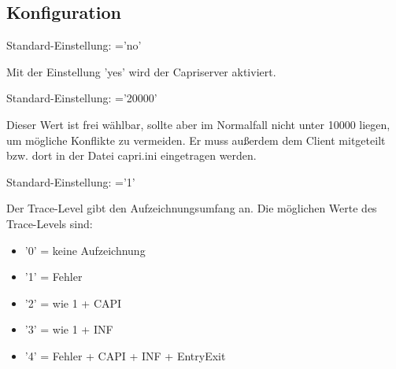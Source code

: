 \subsection{Konfiguration}
\begin{description}


        Standard-Einstellung: ='no'

        Mit der Einstellung 'yes' wird der Capriserver aktiviert.


        Standard-Einstellung: ='20000'

        Dieser Wert ist frei wählbar, sollte aber im Normalfall nicht unter 10000
        liegen, um mögliche Konflikte zu vermeiden. Er muss außerdem dem Client
        mitgeteilt bzw. dort in der Datei capri.ini eingetragen werden.



        Standard-Einstellung: ='1'

        Der Trace-Level gibt den Aufzeichnungsumfang an.
        Die möglichen Werte des Trace-Levels sind:

        \begin{itemize}
            \item '0' = keine Aufzeichnung
            \item '1' = Fehler
            \item '2' = wie 1 + CAPI
            \item '3' = wie 1 + INF
            \item '4' = Fehler + CAPI + INF + EntryExit
        \end{itemize}




\end{description}
